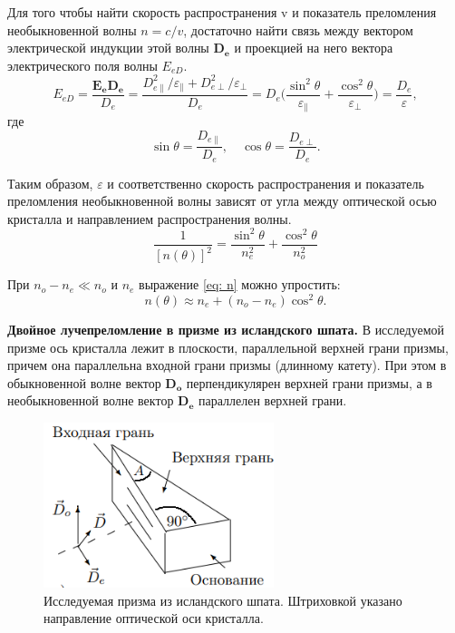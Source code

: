 \documentclass[a4paper,12pt]{article}
\begin{document}
Для того чтобы найти скорость распространения v и показатель преломления необыкновенной волны $n = c/v$, достаточно найти связь между вектором электрической индукции этой волны
$\mathbf{D_e}$ и проекцией на него вектора электрического поля волны $E_{eD}$.
\begin{equation}\label{eq: E_eD}
    E_{eD} = \frac{\mathbf{E_e}\mathbf{D_e}}{D_e} = \frac{D^2_{e\|} / \varepsilon_\| + D^2_{e\perp} / \varepsilon_\perp}{D_e} = D_e\bigg( \frac{\sin^2\theta}{\varepsilon_\|} + \frac{\cos^2\theta}{\varepsilon_\perp}\bigg) = \frac{D_e}{\varepsilon}, 
\end{equation}
где 
\[\sin\theta = \frac{D_{e\|}}{D_e}, \quad \cos\theta = \frac{D_{e\perp}}{D_{e}}.\]

Таким образом, $\varepsilon$ и соответственно скорость распространения и показатель преломления необыкновенной волны зависят от угла между оптической осью кристалла и направлением распространения волны.
\begin{equation}\label{eq: n}
    \frac{1}{[n(\theta)]^2} = \frac{\sin^2\theta}{n^2_e} + \frac{\cos^2\theta}{n^2_o}
\end{equation}

При $n_o - n_e \ll n_o$ и $n_e$ выражение \eqref{eq: n} можно упростить:
\[n(\theta) \approx n_e + (n_o - n_e)\cos^2\theta.\]

\textbf{Двойное лучепреломление в призме из исландского шпата.} В исследуемой призме ось кристалла лежит в плоскости, параллельной верхней грани призмы, причем она параллельна входной грани призмы (длинному катету). При этом в обыкновенной волне вектор $\mathbf{D_o}$ перпендикулярен верхней грани призмы, а в необыкновенной волне вектор $\mathbf{D_e}$ параллелен верхней грани.
\begin{figure}[H]\label{fig: Prism}
    \centering
    \includegraphics[width = 0.6\textwidth]{Prism.png}
    \caption{Исследуемая призма из исландского шпата. Штриховкой указано направление оптической оси кристалла.}
\end{figure}
\end{document}

